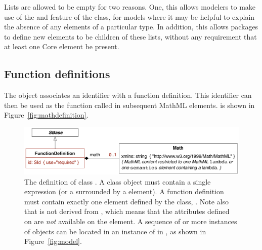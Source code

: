 \begin{blockChanged}
Lists are allowed to be empty for two reasons.  One, this allows modelers to make use of the \Annotation and \Notes feature of the class, for models where it may be helpful to explain the absence of any elements of a particular type.  In addition, this allows packages to define new elements to be children of these lists, without any requirement that at least one Core element be present.
\end{blockChanged}

\subsection{Function definitions}
\label{sec:functiondefinition}

The \FunctionDefinition object associates an identifier with a
function definition.  This identifier can then be used as the
function called in subsequent MathML  elements.
\FunctionDefinition is shown in Figure~\ref{fig:mathdefinition}.

\begin{figure}[htb]
  \centering
  \small
  \vspace*{-0.75ex}
  \includegraphics[scale=0.78]{figs/functiondefinition-uml}
  \vspace*{-1ex}
  \caption{The definition of class \FunctionDefinition.  A
     class object must contain a single \mathml
     expression (or a  surrounded by a
     element).  A function definition must
    contain exactly one  element defined by the
     class, .  Note also that  is not
    derived from \SBaseUpright, which means that the attributes defined
    on \SBaseUpright are \emph{not} available on the 
    element.  A sequence of  or more instances of
    \FunctionDefinition objects can be located in an instance of
    \ListOfFunctionDefinitions in \Model, as shown in
    Figure~\protect\ref{fig:model}.}
  \label{fig:mathdefinition}
  \label{fig:functionDefinition}
\end{figure}

